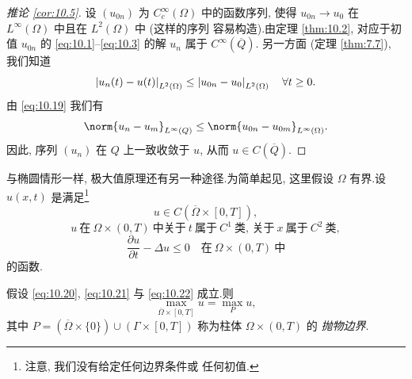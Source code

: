 \begin{proof}[推论 \ref{cor:10.5}]
设 $(u_{0n})$ 为 $C_c^\infty(\Omega)$ 中的函数序列, 使得
$u_{0n}\to u_0$ 在 $L^\infty(\Omega)$ 中且在 $L^2(\Omega)$ 中 (这样的序列
容易构造).由定理  \ref{thm:10.2}, 对应于初值 $u_{0n}$ 的
\eqref{eq:10.1}--\eqref{eq:10.3} 的解 $u_n$ 属于 $C^\infty(\overline Q)$.
另一方面 (定理  \ref{thm:7.7}), 我们知道
\begin{equation*}
\left|u_n(t)-u(t)\right|_{L^2(\Omega)}\le\left|u_{0n}-u_0\right|_{L^2(\Omega)}
\quad\forall t\ge0.
\end{equation*}
由 \eqref{eq:10.19} 我们有
\begin{equation*}
\norm{u_n-u_m}_{L^\infty(Q)}\le\norm{u_{0n}-u_{0m}}_{L^\infty(\Omega)}.
\end{equation*}
因此, 序列 $(u_n)$ 在 $Q$ 上一致收敛于 $u$, 从而 $u\in C(\overline Q)$.
\end{proof}

与椭圆情形一样, 极大值原理还有另一种途径.为简单起见, 这里假设
$\Omega$ 有界.设 $u(x,t)$ 是满足\footnote{注意, 我们没有给定任何边界条件或
任何初值.}
\begin{equation}
u\in C(\overline\Omega\times[0,T]),
\label{eq:10.20}
\end{equation}
\begin{equation}
u\ \text{在}\ \Omega\times(0,T)\ \text{中关于}\ t\ \text{属于}\ C^1\
\text{类, 关于}\ x\ \text{属于}\ C^2\ \text{类},
\label{eq:10.21}
\end{equation}
\begin{equation}
\frac{\partial u}{\partial t}-\Delta u\le0\quad\text{在}\
\Omega\times(0,T)\ \text{中}
\label{eq:10.22}
\end{equation}
的函数.

\begin{theorem}
\label{thm:10.6}
假设 \eqref{eq:10.20}, \eqref{eq:10.21} 与 \eqref{eq:10.22} 成立.则
\begin{equation}
\max_{\overline\Omega\times[0,T]}u=\max_Pu,
\label{eq:10.23}
\end{equation}
其中 $P=(\overline\Omega\times\{0\})\cup(\Gamma\times[0,T])$ 称为柱体
$\Omega\times(0,T)$ 的\emph{
抛物边界}.
\end{theorem}

